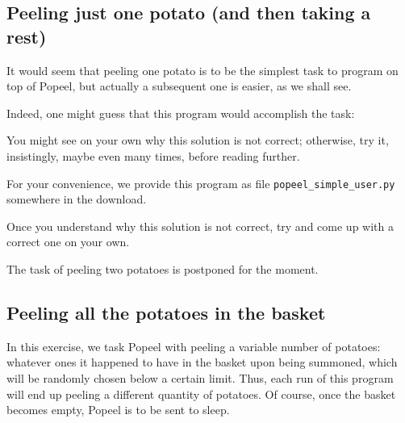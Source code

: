 \documentclass[12pt]{article}
\begin{document}
\subsection{Peeling just one potato (and then taking a rest)}

It would seem that peeling one potato is to be
the simplest task to program on top of Popeel,
but actually a subsequent one is easier, as we
shall see.








Indeed, one might guess that this program would
accomplish the task:




You might see on your own why this solution is not correct; 
otherwise, try it, insistingly, maybe even many times, 
before reading further. 

For your convenience, we provide 
this program as file 
{\tt popeel_simple_user.py} somewhere in the download.

%
Once you understand why this solution is not
correct, try and come up with a correct one
on your own. 

The task of peeling two potatoes is postponed for the moment.

\subsection{Peeling all the potatoes in the basket}

In this exercise, we task Popeel with peeling a
variable number of potatoes: whatever ones it 
happened to have in the basket upon being summoned,
which will be randomly chosen below a certain limit.
Thus, each run of this program will end up peeling a 
different quantity of potatoes. Of course, once the
basket becomes empty, Popeel is to be sent to sleep.
\end{document}

